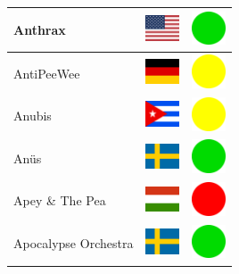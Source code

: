 \documentclass[12pt, a4paper, twoside]{report}
\begin{document}
\begin{center}
\begin{longtable}{|p{5cm}|p{2cm}|p{2cm}|}
Anthrax & \includegraphics[width=1cm]{4x3/us} & \includegraphics[width=1cm]{likes/y} \\ \hline
AntiPeeWee & \includegraphics[width=1cm]{4x3/de} & \includegraphics[width=1cm]{likes/m} \\ \hline
Anubis & \includegraphics[width=1cm]{4x3/cu} & \includegraphics[width=1cm]{likes/m} \\ \hline
Anüs & \includegraphics[width=1cm]{4x3/se} & \includegraphics[width=1cm]{likes/y} \\ \hline
Apey \& The Pea & \includegraphics[width=1cm]{4x3/hu} & \includegraphics[width=1cm]{likes/n} \\ \hline
Apocalypse Orchestra & \includegraphics[width=1cm]{4x3/se} & \includegraphics[width=1cm]{likes/y} \\ \hline

\end{longtable}
\end{center}
\end{document}

